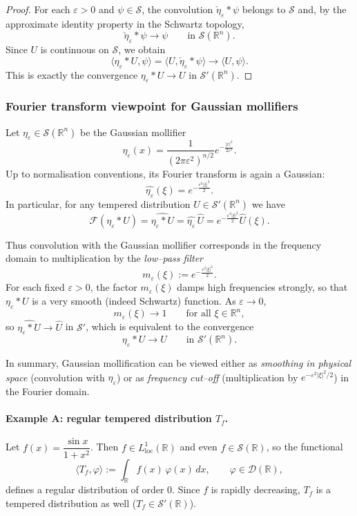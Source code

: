 \documentclass[12pt,a4paper]{article}
\theoremstyle{plain}
\theoremstyle{definition}
\theoremstyle{remark}
\theoremstyle{remark}
\begin{document}
\begin{proof}
	For each $\varepsilon>0$ and $\psi\in\mathcal{S}$, the convolution
	$\check{\eta}_\varepsilon * \psi$ belongs to $\mathcal{S}$ and, by the
	approximate identity property in the Schwartz topology,
	\[
	\check{\eta}_\varepsilon * \psi \longrightarrow \psi
	\qquad\text{in }\mathcal{S}(\mathbb{R}^n).
	\]
	Since $U$ is continuous on $\mathcal{S}$, we obtain
	\[
	\langle \eta_\varepsilon * U, \psi\rangle
	= \big\langle U, \check{\eta}_\varepsilon * \psi\big\rangle
	\longrightarrow \langle U,\psi\rangle.
	\]
	This is exactly the convergence $\eta_\varepsilon*U\to U$ in
	$\mathcal{S}'(\mathbb{R}^n)$.
\end{proof}
\subsubsection*{Fourier transform viewpoint for Gaussian mollifiers}

Let $\eta_\varepsilon\in\mathcal{S}(\mathbb{R}^n)$ be the Gaussian
mollifier
\[
\eta_\varepsilon(x)
= \frac{1}{(2\pi\varepsilon^2)^{n/2}}
e^{-\frac{|x|^2}{2\varepsilon^2}}.
\]
Up to normalisation conventions, its Fourier transform is again a
Gaussian:
\[
\widehat{\eta_\varepsilon}(\xi)
= e^{-\frac{\varepsilon^2|\xi|^2}{2}}.
\]
In particular, for any tempered distribution $U\in\mathcal{S}'(\mathbb{R}^n)$
we have
\[
\mathcal{F}(\eta_\varepsilon * U)
= \widehat{\eta_\varepsilon * U}
= \widehat{\eta_\varepsilon}\,\widehat{U}
= e^{-\frac{\varepsilon^2|\xi|^2}{2}}\widehat{U}(\xi).
\]

Thus convolution with the Gaussian mollifier corresponds in the
frequency domain to multiplication by the \emph{low--pass filter}
\[
m_\varepsilon(\xi)
:= e^{-\frac{\varepsilon^2|\xi|^2}{2}}.
\]
For each fixed $\varepsilon>0$, the factor $m_\varepsilon(\xi)$ damps
high frequencies strongly, so that $\eta_\varepsilon*U$ is a very smooth
(indeed Schwartz) function. As $\varepsilon\to0$,
\[
m_\varepsilon(\xi) \longrightarrow 1
\qquad\text{for all }\xi\in\mathbb{R}^n,
\]
so $\widehat{\eta_\varepsilon * U}\to\widehat{U}$ in $\mathcal{S}'$,
which is equivalent to the convergence
\[
\eta_\varepsilon * U \longrightarrow U
\qquad\text{in }\mathcal{S}'(\mathbb{R}^n).
\]

In summary, Gaussian mollification can be viewed either as
\emph{smoothing in physical space} (convolution with $\eta_\varepsilon$)
or as \emph{frequency cut--off} (multiplication by
$e^{-\varepsilon^2|\xi|^2/2}$) in the Fourier domain.


\paragraph{Example A: regular tempered distribution $T_f$.}
Let $f(x)=\dfrac{\sin x}{1+x^2}$. Then $f\in L^1_{\mathrm{loc}}(\mathbb{R})$
and even $f\in\mathcal{S}(\mathbb{R})$, so the functional
\[
\langle T_f,\varphi\rangle := \int_{\mathbb{R}} f(x)\,\varphi(x)\,dx,
\qquad \varphi\in\mathcal{D}(\mathbb{R}),
\]
defines a regular distribution of order $0$. Since $f$ is rapidly
decreasing, $T_f$ is a tempered distribution as well
($T_f\in\mathcal{S}'(\mathbb{R})$).
\end{document}
